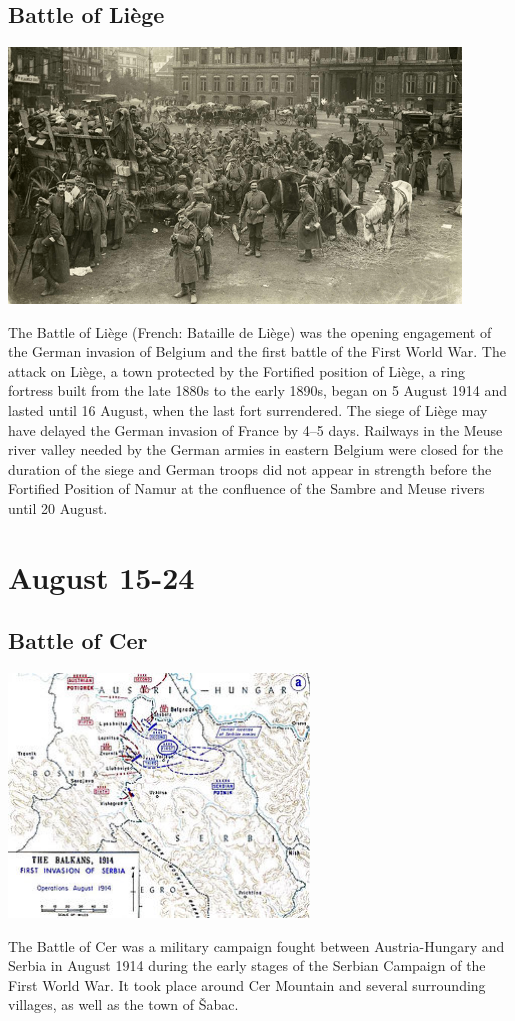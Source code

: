 \documentclass[11pt]{report}
\begin{document}
\subsection{Battle of Liège}
\vspace{2mm}\begin{center}\includegraphics[width=12cm]{./img/battleOfLiege.png}\end{center}
The Battle of Liège (French: Bataille de Liège) was the opening engagement of the German invasion of Belgium and the first battle of the First World War. The attack on Liège, a town protected by the Fortified position of Liège, a ring fortress built from the late 1880s to the early 1890s, began on 5 August 1914 and lasted until 16 August, when the last fort surrendered. The siege of Liège may have delayed the German invasion of France by 4–5 days. Railways in the Meuse river valley needed by the German armies in eastern Belgium were closed for the duration of the siege and German troops did not appear in strength before the Fortified Position of Namur at the confluence of the Sambre and Meuse rivers until 20 August.

\section{August 15-24}
\subsection{Battle of Cer}
\vspace{2mm}\begin{center}\includegraphics[width=8cm]{./img/battleOfCer.jpg}\end{center}
The Battle of Cer was a military campaign fought between Austria-Hungary and Serbia in August 1914 during the early stages of the Serbian Campaign of the First World War. It took place around Cer Mountain and several surrounding villages, as well as the town of Šabac.
\end{document}

